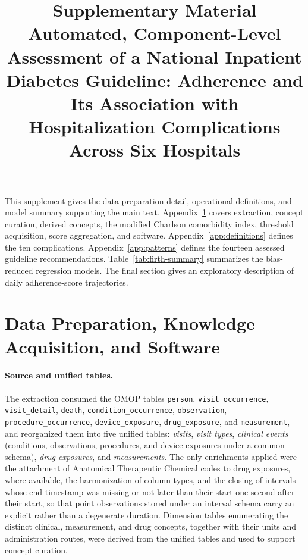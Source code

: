 \documentclass[11pt,a4paper]{article}
\title{\bfseries Supplementary Material\\[0.4em]
\large Automated, Component-Level Assessment of a National Inpatient
Diabetes Guideline: Adherence and Its Association with Hospitalization
Complications Across Six Hospitals}
\date{}
\begin{document}
\maketitle

\noindent
This supplement gives the data-preparation detail, operational definitions,
and model summary supporting the main text. Appendix~\ref{app:data-prep}
covers extraction, concept curation, derived concepts, the modified Charlson
comorbidity index, threshold acquisition, score aggregation, and software.
Appendix~\ref{app:definitions} defines the ten complications.
Appendix~\ref{app:patterns} defines the fourteen assessed guideline
recommendations. Table~\ref{tab:firth-summary} summarizes the bias-reduced
regression models. The final section gives an exploratory description of daily
adherence-score trajectories.

\section{Data Preparation, Knowledge Acquisition, and Software}
\label{app:data-prep}

\paragraph{Source and unified tables.}
The extraction consumed the OMOP tables \texttt{person},
\texttt{visit\_occurrence}, \texttt{visit\_detail}, \texttt{death},
\texttt{condition\_occurrence}, \texttt{observation},
\texttt{procedure\_occurrence}, \texttt{device\_exposure},
\texttt{drug\_exposure}, and \texttt{measurement}, and reorganized them into
five unified tables: \emph{visits}, \emph{visit types}, \emph{clinical
events} (conditions, observations, procedures, and device exposures under a
common schema), \emph{drug exposures}, and \emph{measurements}. The only
enrichments applied were the attachment of Anatomical Therapeutic Chemical
codes to drug exposures, where available, the harmonization of column types,
and the closing of intervals whose end timestamp was missing or not later
than their start one second after their start, so that point observations
stored under an interval schema carry an explicit rather than a degenerate
duration. Dimension tables enumerating the distinct clinical, measurement,
and drug concepts, together with their units and administration routes, were
derived from the unified tables and used to support concept curation.
\end{document}
